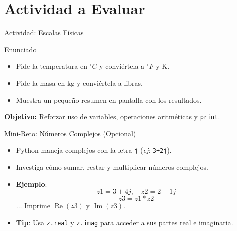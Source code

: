 \documentclass[10pt]{beamer}
\begin{document}
\section{Actividad a Evaluar}

\begin{frame}{Actividad: Escalas Físicas}
  \begin{block}{Enunciado}
    \begin{itemize}
      \item Pide la temperatura en \(^\circ C\) y conviértela a \(^\circ F\) y K.
      \item Pide la masa en kg y conviértela a libras.
      \item Muestra un pequeño resumen en pantalla con los resultados.
    \end{itemize}
  \end{block}
  \textbf{Objetivo:} Reforzar uso de variables, operaciones aritméticas y \texttt{print}.
\end{frame}

\begin{frame}{Mini-Reto: Números Complejos (Opcional)}
  \begin{itemize}
    \item Python maneja complejos con la letra \texttt{j} (\emph{ej}: \texttt{3+2j}).
    \item Investiga cómo sumar, restar y multiplicar números complejos.
    \item \textbf{Ejemplo}:
      \[
        z1 = 3 + 4j, \quad z2 = 2 - 1j
      \]
      \[
        z3 = z1 * z2
      \]
      \(\dots\) Imprime \(\operatorname{Re}(z3)\) y \(\operatorname{Im}(z3)\).
    \item \textbf{Tip}: Usa \texttt{z.real} y \texttt{z.imag} para acceder a sus partes real e imaginaria.
  \end{itemize}
\end{frame}
\end{document}
